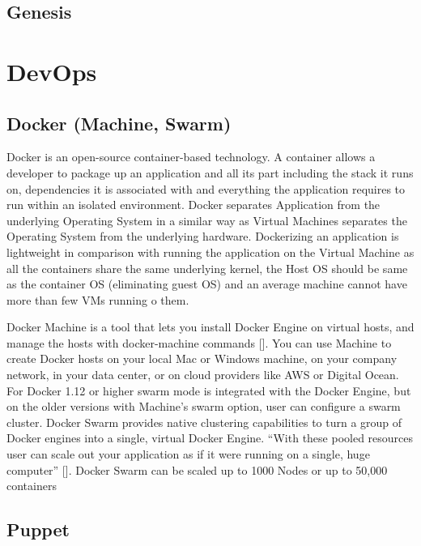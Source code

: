 \subsection{Genesis}

\section{DevOps}
\label{S:o-DevOps}

\subsection{Docker (Machine, Swarm)}

Docker is an open-source container-based technology. A container
allows a developer to package up an application and all its part
including the stack it runs on, dependencies it is associated with and
everything the application requires to run within an isolated
environment. Docker separates Application from the underlying
Operating System in a similar way as Virtual Machines separates the
Operating System from the underlying hardware. Dockerizing an
application is lightweight in comparison with running the application
on the Virtual Machine as all the containers share the same underlying
kernel, the Host OS should be same as the container OS (eliminating
guest OS) and an average machine cannot have more than few VMs running
o them.

Docker Machine is a tool that lets you install Docker Engine on
virtual hosts, and manage the hosts with docker-machine commands
[\cite{docker-book}]. You can use Machine to create Docker hosts on
your local Mac or Windows machine, on your company network, in your
data center, or on cloud providers like AWS or Digital Ocean. For
Docker 1.12 or higher swarm mode is integrated with the Docker Engine,
but on the older versions with Machine's swarm option, user can
configure a swarm cluster. Docker Swarm provides native clustering
capabilities to turn a group of Docker engines into a single, virtual
Docker Engine. ``With these pooled resources user can scale out your
application as if it were running on a single, huge computer''
[\cite{www-docker}]. Docker Swarm can be scaled up to 1000 Nodes or up
to 50,000 containers
     
\subsection{Puppet}

